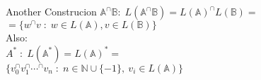 \dfn
{
    Another Construcion
}
{
    $\mathbb{A}^{\cap}\mathbb{B}:\; L(\mathbb{A}^{\cap}\mathbb{B}) = L(\mathbb{A})^{\cap}L(\mathbb{B})=$\\
    $= \{w^{\cap}v\; : \; w \in L(\mathbb{A}), v \in L(\mathbb{B})\}$\\
    Also:\\
    $A^{*}\; : \; L(\mathbb{A^{*}}) = L(\mathbb{A})^{*} =$\\
    $\{ v_0^{\cap}v_1^{\cap}\cdots^{\cap}v_n \; : \; n\in \mathbb{N}\cup \{-1\},\: v_i \in L(\mathbb{A}) \}$
}
